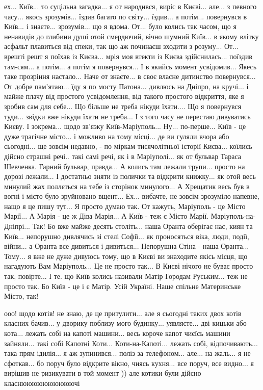 ех... Київ... то суцільна загадка... я от народився, виріс в Києві... але... з
певного часу... якось зрозумів... їздив багато по світу... їздив... а потім...
повернувся в Київ... і знаєте... зрозумів... що я вдома. От... було колись так
часом, що я ненавидів до глибини душі отой смердючий, вічно шумний Київ... в
якому влітку асфальт плавиться від спеки, так що аж починаєш зходити з
розуму... От... врешті решт я поїхав із Києва... мрія моя втекти із Києва
здійснилась... поїздив там-сям... а потім... а потім я повернувся... І в якийсь
момент усвідомив... Якесь таке прозріння настало... Наче от знаєте... в своє
власне дитинство повернувся... От добре пам'ятаю... їду я по мосту Патона...
дивлюсь на Дніпро, на кручі... і майже плачу від простого усвідомлення, від
такого простого відкриття, яке я зробив сам для себе... Що більше не треба
нікуди їхати.... Що я повернувся туди... звідки вже нікуди їхати не треба... І
з того часу не перестаю дивуватись Києву. І зокрема... щодо зв'язку
Київ-Маріуполь... Ну... по-перше... Київ - це дуже трагічне місто... і можливо
на тому місці... де ви гуляли вчора або сьогодні... ще зовсім недавно, - по
міркам тисячолітньої історії Києва... коїлись дійсно страшні речі.. такі самі
речі, як і в Маріуполі... як от бульвар Тараса Шевченка. Гарний бульвар,
правда... А колись там лежали трупи... просто на дорозі лежали... І достатньо
зняти із полички та відкрити книжку... як отой весь минулий жах поллється на
тебе із сторінок минулого... А Хрещатик весь був в вогні і місто було
зруйновано вщент... Ех... вибачте, не зовсім зрозуміло напевне, нащо я це пишу
тут... Я просто думаю так. От кажуть, Маріуполь - це Місто Марії... А Марія -
це ж Діва Марія... А Київ - теж є Місто Марії. Маріуполь-на-Дніпрі... Так! Бо
вже майже десять століть... наша Оранта оберігає нас, киян та Київ... непорушно
дивлячись зі стелі Софії... як проносяться віка, люди, події, війни... а Оранта
все дивиться і дивиться... Непорушна Стіна - наша Оранта... Тому... я вже не
дуже дивуюсь тому, що в Києві ви знаходите якісь місця, що нагадують Вам
Маріуполь... Це не просто так... В Києві нічого не буває просто так, повірте...
І те. що Київ колись називали Матір Городам Руським... теж не просто так. Бо
Київ - це і є Матір. Усій Україні. Наше спільне Материнське Місто, так! 

ооо! щодо котів! не знаю, де це притулити... але я сьогодні таких двох котів
класних бачив... у дворику поблизу мого будинку... уявляєте... дві кицьки або
кота... лежать собі на капоті машини... весь короче капот чиєїсь машини
зайняли... такі собі Капотні Коти... Коти-на-Капоті... лежать собі,
відпочивають... така прям ідилія... я аж зупинився... поліз за телефоном...
але... на жаль... я не сфоткав... бо поруч було відкрите вікно, чиясь кухня...
все поруч, все видно... я вирішив не ризикувати в той момент )) але котики були
дійсно класнюююююююююючі

